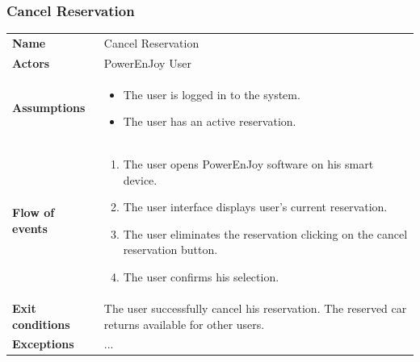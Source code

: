 \documentclass[english]{article}
\begin{document}
	\subsubsection{Cancel Reservation}
	\begin{center}
	\begin{tabular}{l||p{10cm}}
	\textbf{Name} 
		& Cancel Reservation\\ [8px]
	\textbf{Actors} 
		& PowerEnJoy User\\ [8px]
	\textbf{Assumptions} 
		& \begin{itemize}
			\item The user is logged in to the system.
			\item The user has an active reservation.
		\end{itemize}\\
	\textbf{Flow of events}
		& \begin{enumerate}
 			\item The user opens PowerEnJoy software on his smart device.
 			\item The user interface displays user's current reservation.
			\item The user eliminates the reservation clicking on the cancel reservation button.
			\item The user confirms his selection.
		\end{enumerate}\\ 
	\textbf{Exit conditions}
		&The user successfully cancel his reservation. The reserved car returns available for other users.\\ [8px]
	\textbf{Exceptions}
		&...\\[8px]
	\end{tabular}
	\end{center}
\end{document}
